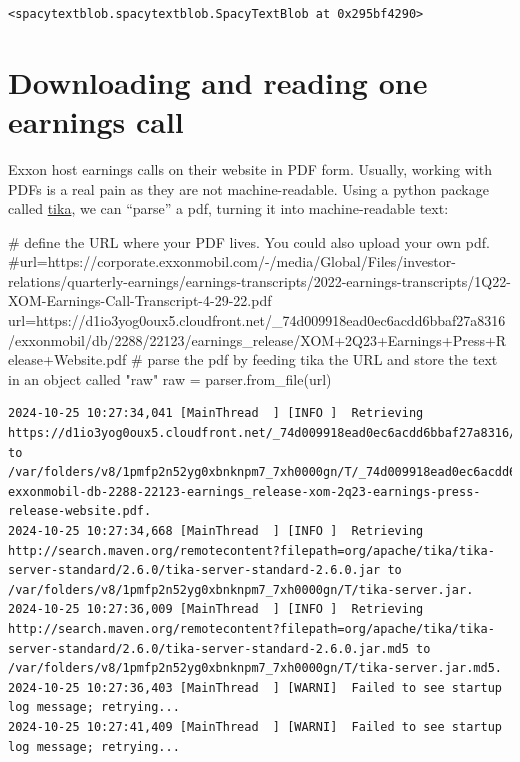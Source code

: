 \documentclass[
  letterpaper,
  DIV=11,
  numbers=noendperiod]{scrreprt}
\newenvironment{Shaded}{\begin{snugshade}}{\end{snugshade}}
\newcommand{\CommentTok}[1]{\textcolor[rgb]{0.37,0.37,0.37}{#1}}
\newcommand{\NormalTok}[1]{\textcolor[rgb]{0.00,0.23,0.31}{#1}}
\newcommand{\OperatorTok}[1]{\textcolor[rgb]{0.37,0.37,0.37}{#1}}
\newcommand{\StringTok}[1]{\textcolor[rgb]{0.13,0.47,0.30}{#1}}
\begin{document}
\begin{verbatim}
<spacytextblob.spacytextblob.SpacyTextBlob at 0x295bf4290>
\end{verbatim}

\hypertarget{downloading-and-reading-one-earnings-call}{%
\section{Downloading and reading one earnings
call}\label{downloading-and-reading-one-earnings-call}}

Exxon host earnings calls on their website in PDF form. Usually, working
with PDFs is a real pain as they are not machine-readable. Using a
python package called
\href{https://www.geeksforgeeks.org/parsing-pdfs-in-python-with-tika/}{tika},
we can ``parse'' a pdf, turning it into machine-readable text:

\begin{Shaded}
\begin{Highlighting}[]
\CommentTok{\# define the URL where your PDF lives. You could also upload your own pdf.}
\CommentTok{\#url=\textquotesingle{}https://corporate.exxonmobil.com/{-}/media/Global/Files/investor{-}relations/quarterly{-}earnings/earnings{-}transcripts/2022{-}earnings{-}transcripts/1Q22{-}XOM{-}Earnings{-}Call{-}Transcript{-}4{-}29{-}22.pdf\textquotesingle{}}
\NormalTok{url}\OperatorTok{=}\StringTok{\textquotesingle{}https://d1io3yog0oux5.cloudfront.net/\_74d009918ead0ec6acdd6bbaf27a8316/exxonmobil/db/2288/22123/earnings\_release/XOM+2Q23+Earnings+Press+Release+Website.pdf\textquotesingle{}}
\CommentTok{\# parse the pdf by feeding tika the URL and store the text in an object called "raw" }
\NormalTok{raw }\OperatorTok{=}\NormalTok{ parser.from\_file(url)}
\end{Highlighting}
\end{Shaded}

\begin{verbatim}
2024-10-25 10:27:34,041 [MainThread  ] [INFO ]  Retrieving https://d1io3yog0oux5.cloudfront.net/_74d009918ead0ec6acdd6bbaf27a8316/exxonmobil/db/2288/22123/earnings_release/XOM+2Q23+Earnings+Press+Release+Website.pdf to /var/folders/v8/1pmfp2n52yg0xbnknpm7_7xh0000gn/T/_74d009918ead0ec6acdd6bbaf27a8316-exxonmobil-db-2288-22123-earnings_release-xom-2q23-earnings-press-release-website.pdf.
2024-10-25 10:27:34,668 [MainThread  ] [INFO ]  Retrieving http://search.maven.org/remotecontent?filepath=org/apache/tika/tika-server-standard/2.6.0/tika-server-standard-2.6.0.jar to /var/folders/v8/1pmfp2n52yg0xbnknpm7_7xh0000gn/T/tika-server.jar.
2024-10-25 10:27:36,009 [MainThread  ] [INFO ]  Retrieving http://search.maven.org/remotecontent?filepath=org/apache/tika/tika-server-standard/2.6.0/tika-server-standard-2.6.0.jar.md5 to /var/folders/v8/1pmfp2n52yg0xbnknpm7_7xh0000gn/T/tika-server.jar.md5.
2024-10-25 10:27:36,403 [MainThread  ] [WARNI]  Failed to see startup log message; retrying...
2024-10-25 10:27:41,409 [MainThread  ] [WARNI]  Failed to see startup log message; retrying...
\end{verbatim}
\end{document}
